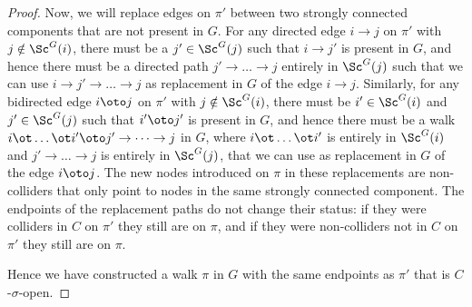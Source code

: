 \begin{proof}
Now, we will replace edges on $\pi'$ between two strongly connected components that are not present in $G$.
For any directed edge $i \to j$ on $\pi'$ with $j \notin \Sc^G(i)$, there
must be a $j' \in \Sc^G(j)$ such that $i \to j'$ is present in $G$, and hence there must be a directed path
$j' \to \dots \to j$ entirely in $\Sc^G(j)$ such that we can use
$i \to j' \to \dots \to j$ as replacement in $G$ of the edge $i \to j$.
Similarly, for any bidirected edge $i \oto j$ on $\pi'$ with $j \notin \Sc^G(i)$, there
must be $i' \in \Sc^G(i)$ and $j' \in \Sc^G(j)$ such that $i' \oto j'$ is present in $G$, 
and hence there must be a walk $i \ot \dots \ot i' \oto j' \to \dots \to j$ in $G$, where
$i \ot \dots \ot i'$ is entirely in $\Sc^G(i)$ and $j' \to \dots \to j$ is entirely
in $\Sc^G(j)$, that we can use as replacement in $G$ of the edge $i \oto j$.
The new nodes introduced on $\pi$ in these replacements are non-colliders
that only point to nodes in the same strongly connected component. 
The endpoints of the replacement paths do not change their status:
if they were colliders in $C$ on $\pi'$ they still are 
on $\pi$, and if they were non-colliders not in $C$ on $\pi'$ they still are on $\pi$.

Hence we have constructed a walk $\pi$ in $G$ with the same endpoints as $\pi'$ that is $C$-$\sigma$-open.
\end{proof}

